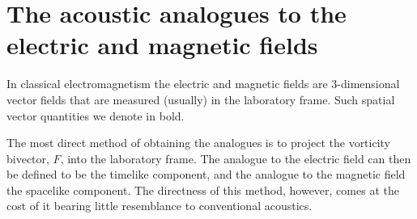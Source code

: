 \documentclass[10pt, fleqn,draft,showtrims,oldfontcommands]{article} %
\newcommand{\secref}[1]{section~\ref{sec:#1}}
\newcommand{\g}{\gamma_0}
\newcommand{\nlist}[1]
	   {  
	     \begin{enumerate}
	       #1
	     \end{enumerate} 
	   }
\begin{document}







\section{The acoustic analogues to the electric and magnetic fields}\label{sec:int:EM}

In classical electromagnetism the electric and magnetic fields are 
3-dimensional vector fields that are measured (usually) in the laboratory frame.
Such spatial vector quantities we denote in bold.

The most direct method of obtaining the analogues  is to project the vorticity bivector, $F$, into the laboratory  frame\cite{Hestenes2003, Doran2003}.
The analogue to the electric field can then be defined to be the timelike component, and the analogue to the magnetic field the spacelike component.
The directness of this method, however, comes at the cost of it bearing little  resemblance to conventional acoustics.
\end{document}
